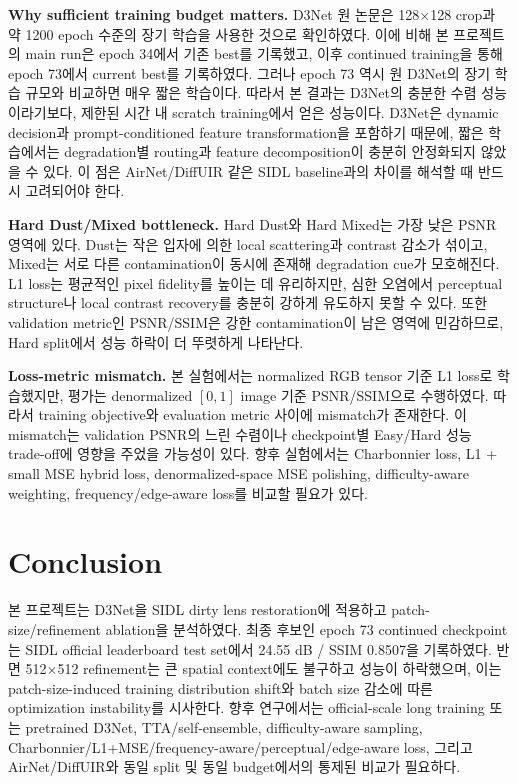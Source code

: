 \documentclass[10pt,a4paper]{article}
\begin{document}
\textbf{Why sufficient training budget matters.}
D3Net 원 논문은 128$\times$128 crop과 약 1200 epoch 수준의 장기 학습을 사용한 것으로 확인하였다.
이에 비해 본 프로젝트의 main run은 epoch 34에서 기존 best를 기록했고, 이후 continued training을 통해 epoch 73에서 current best를 기록하였다.
그러나 epoch 73 역시 원 D3Net의 장기 학습 규모와 비교하면 매우 짧은 학습이다.
따라서 본 결과는 D3Net의 충분한 수렴 성능이라기보다, 제한된 시간 내 scratch training에서 얻은 성능이다.
D3Net은 dynamic decision과 prompt-conditioned feature transformation을 포함하기 때문에, 짧은 학습에서는 degradation별 routing과 feature decomposition이 충분히 안정화되지 않았을 수 있다.
이 점은 AirNet/DiffUIR 같은 SIDL baseline과의 차이를 해석할 때 반드시 고려되어야 한다.

\textbf{Hard Dust/Mixed bottleneck.}
Hard Dust와 Hard Mixed는 가장 낮은 PSNR 영역에 있다.
Dust는 작은 입자에 의한 local scattering과 contrast 감소가 섞이고, Mixed는 서로 다른 contamination이 동시에 존재해 degradation cue가 모호해진다.
L1 loss는 평균적인 pixel fidelity를 높이는 데 유리하지만, 심한 오염에서 perceptual structure나 local contrast recovery를 충분히 강하게 유도하지 못할 수 있다.
또한 validation metric인 PSNR/SSIM은 강한 contamination이 남은 영역에 민감하므로, Hard split에서 성능 하락이 더 뚜렷하게 나타난다.

\textbf{Loss-metric mismatch.}
본 실험에서는 normalized RGB tensor 기준 L1 loss로 학습했지만, 평가는 denormalized $[0,1]$ image 기준 PSNR/SSIM으로 수행하였다.
따라서 training objective와 evaluation metric 사이에 mismatch가 존재한다.
이 mismatch는 validation PSNR의 느린 수렴이나 checkpoint별 Easy/Hard 성능 trade-off에 영향을 주었을 가능성이 있다.
향후 실험에서는 Charbonnier loss, L1 + small MSE hybrid loss, denormalized-space MSE polishing, difficulty-aware weighting, frequency/edge-aware loss를 비교할 필요가 있다.

\section{Conclusion}
본 프로젝트는 D3Net을 SIDL dirty lens restoration에 적용하고 patch-size/refinement ablation을 분석하였다.
최종 후보인 epoch 73 continued checkpoint는 SIDL official leaderboard test set에서 24.55 dB / SSIM 0.8507을 기록하였다.
반면 512$\times$512 refinement는 큰 spatial context에도 불구하고 성능이 하락했으며, 이는 patch-size-induced training distribution shift와 batch size 감소에 따른 optimization instability를 시사한다.
향후 연구에서는 official-scale long training 또는 pretrained D3Net, TTA/self-ensemble, difficulty-aware sampling, Charbonnier/L1+MSE/frequency-aware/perceptual/edge-aware loss, 그리고 AirNet/DiffUIR와 동일 split 및 동일 budget에서의 통제된 비교가 필요하다.



\end{document}
